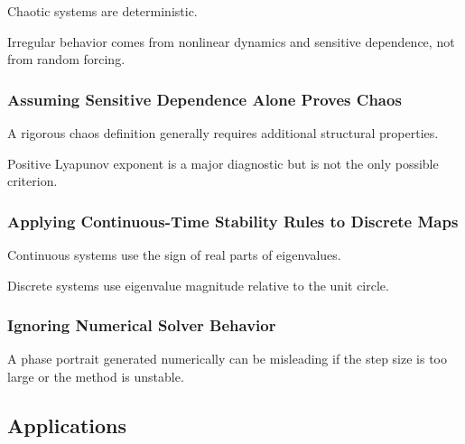 Chaotic systems are deterministic.

Irregular behavior comes from nonlinear dynamics and sensitive dependence,
not from random forcing.

\subsubsection{Assuming Sensitive Dependence Alone Proves Chaos}

A rigorous chaos definition generally requires additional structural
properties.

Positive Lyapunov exponent is a major diagnostic but is not the only
possible criterion.

\subsubsection{Applying Continuous-Time Stability Rules to Discrete Maps}

Continuous systems use the sign of real parts of eigenvalues.

Discrete systems use eigenvalue magnitude relative to the unit circle.

\subsubsection{Ignoring Numerical Solver Behavior}

A phase portrait generated numerically can be misleading if the step size
is too large or the method is unstable.

\subsection{Applications}
\label{subsec:dynamical-systems-applications}

